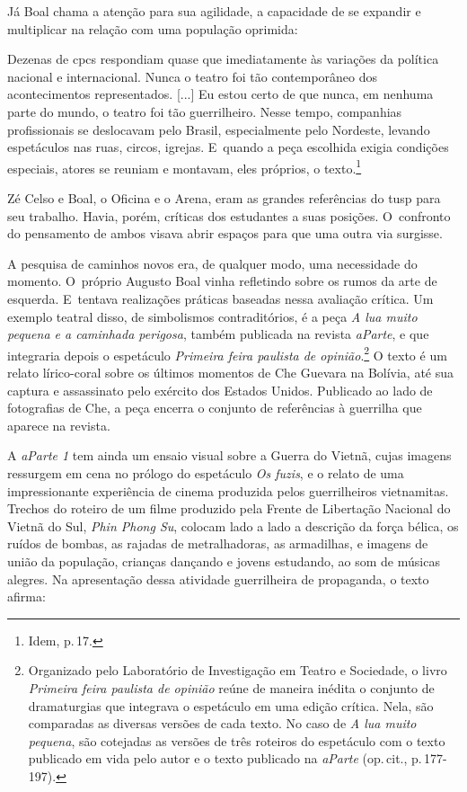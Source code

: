 Já Boal chama a atenção para sua agilidade, a capacidade de se expandir e multiplicar na
relação com uma população oprimida:

\startblockquote
Dezenas de {\sc cpc}s respondiam quase que imediatamente às variações da
política nacional e internacional. Nunca o teatro foi tão contemporâneo
dos acontecimentos representados. {[}...{]} Eu estou certo de que nunca,
em nenhuma parte do mundo, o teatro foi tão guerrilheiro. Nesse tempo,
companhias profissionais se deslocavam pelo Brasil, especialmente pelo
Nordeste, levando espetáculos nas ruas, circos, igrejas. E~quando a peça
escolhida exigia condições especiais, atores se reuniam e montavam, eles
próprios, o texto.\footnote{Idem, p.\,17.}
\stopblockquote

Zé Celso e Boal, o Oficina e o Arena, eram as grandes referências do
{\sc tusp} para seu trabalho. Havia, porém, críticas dos estudantes a suas
posições. O~confronto do pensamento de ambos visava abrir espaços para
que uma outra via surgisse.

A pesquisa de caminhos novos era, de qualquer modo, uma necessidade do
momento. O~próprio Augusto Boal vinha refletindo sobre os rumos da arte
de esquerda. E~tentava realizações práticas baseadas nessa avaliação
crítica. Um exemplo teatral disso, de simbolismos contraditórios, é a
peça {\it A lua muito pequena e a caminhada perigosa}, também publicada
na revista {\it aParte}, e que integraria depois o espetáculo
{\it Primeira feira paulista de opinião}.\footnote{Organizado
  pelo Laboratório de Investigação em Teatro e Sociedade, o livro {\it Primeira feira paulista de opinião} reúne de maneira inédita o conjunto de dramaturgias que integrava o espetáculo em
  uma edição crítica. Nela, são comparadas as diversas versões de cada
  texto. No caso de {\it A lua muito pequena}, são cotejadas as versões
  de três roteiros do espetáculo com o texto publicado em vida pelo
  autor e o texto publicado na {\it aParte} (op.\,cit., p.\,177-197).} O texto é um relato lírico-coral sobre os
últimos momentos de Che Guevara na Bolívia, até sua captura e
assassinato pelo exército dos Estados Unidos. Publicado ao lado de
fotografias de Che, a peça encerra o conjunto de referências à guerrilha
que aparece na revista.

A {\it aParte 1} tem ainda um ensaio visual sobre a Guerra do Vietnã,
cujas imagens ressurgem em cena no prólogo do espetáculo {\it Os fuzis},
e o relato de uma impressionante experiência de cinema produzida pelos
guerrilheiros vietnamitas. Trechos do roteiro de um filme produzido pela
Frente de Libertação Nacional do Vietnã do Sul, {\it Phin Phong Su},
colocam lado a lado a descrição da força bélica, os ruídos de bombas, as
rajadas de metralhadoras, as armadilhas, e imagens de união da
população, crianças dançando e jovens estudando, ao som de músicas
alegres. Na apresentação dessa atividade guerrilheira de propaganda, o
texto afirma:

